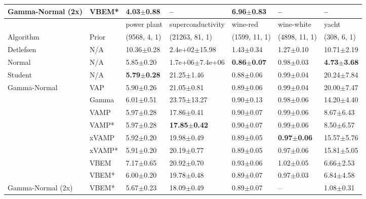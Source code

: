 \begin{tabular}{lllllll}
Gamma-Normal (2x) & VBEM* &           4.03$\pm$0.88 &                           -- &           6.96$\pm$0.83 &                     -- &                           -- \\
\midrule
                  &       &             power plant &        superconductivity &                wine-red &              wine-white &                   yacht \\
Algorithm & Prior& (9568, 4, 1)& (21263, 81, 1)& (1599, 11, 1)& (4898, 11, 1)& (308, 6, 1)\\
\midrule
Detlefsen & N/A &          10.36$\pm$0.28 &        2.4e+02$\pm$15.98 &           1.43$\pm$0.34 &           1.27$\pm$0.10 &          10.71$\pm$2.19 \\
Normal & N/A &           5.85$\pm$0.20 &      1.7e+06$\pm$7.4e+06 &  \textbf{0.86$\pm$0.07} &           0.98$\pm$0.03 &  \textbf{4.73$\pm$3.68} \\
Student & N/A &  \textbf{5.79$\pm$0.28} &           21.25$\pm$1.46 &           0.88$\pm$0.06 &           0.99$\pm$0.04 &          20.24$\pm$7.84 \\
Gamma-Normal & VAP &           5.90$\pm$0.26 &           21.05$\pm$0.81 &           0.89$\pm$0.06 &           0.99$\pm$0.04 &          20.00$\pm$7.47 \\
                  & Gamma &           6.01$\pm$0.51 &          23.75$\pm$13.27 &           0.90$\pm$0.13 &           0.98$\pm$0.06 &          14.20$\pm$4.40 \\
                  & VAMP &           5.97$\pm$0.28 &           17.86$\pm$0.41 &           0.90$\pm$0.07 &           0.99$\pm$0.06 &           8.67$\pm$6.43 \\
                  & VAMP* &           5.97$\pm$0.28 &  \textbf{17.85$\pm$0.42} &           0.90$\pm$0.07 &           0.99$\pm$0.06 &           8.50$\pm$6.57 \\
                  & xVAMP &           5.92$\pm$0.20 &           19.98$\pm$0.49 &           0.89$\pm$0.05 &  \textbf{0.97$\pm$0.06} &          15.57$\pm$5.76 \\
                  & xVAMP* &           5.91$\pm$0.20 &           20.19$\pm$0.77 &           0.89$\pm$0.05 &           0.97$\pm$0.06 &          15.81$\pm$5.05 \\
                  & VBEM &           7.17$\pm$0.65 &           20.92$\pm$0.70 &           0.93$\pm$0.06 &           1.02$\pm$0.05 &           6.66$\pm$2.53 \\
                  & VBEM* &           6.00$\pm$0.20 &           19.78$\pm$0.48 &           0.89$\pm$0.07 &           0.97$\pm$0.03 &           6.84$\pm$4.58 \\
Gamma-Normal (2x) & VBEM* &           5.67$\pm$0.23 &           18.09$\pm$0.49 &           0.89$\pm$0.07 &                     -- &           1.08$\pm$0.31 \\
\bottomrule
\end{tabular}

